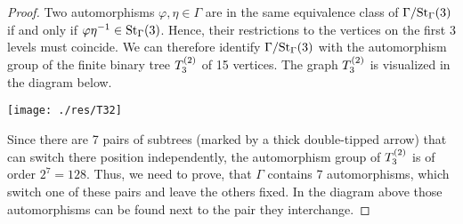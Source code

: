 \begin{proof}
Two automorphisms $\varphi,\eta\in\Gamma$ are in the same equivalence class of $\nicefrac{\Gamma}{\St[\Gamma]{3}}$ if and only if $\varphi\eta^{-1}\in\St[\Gamma]{3}$. Hence, their restrictions to the vertices on the first 3 levels must coincide. We can therefore identify $\nicefrac{\Gamma}{\St[\Gamma]{3}}$ with the automorphism group of the finite binary tree $\T_3$ of 15 vertices. The graph  $\T_3$ is visualized in the diagram below.

\begin{center}
\texttt{[image: ./res/T32]}
%
%
%
\end{center}

Since there are 7 pairs of subtrees (marked by a thick double-tipped arrow) that can switch there position independently, the automorphism group of $\T_3$ is of order $2^7=128$. Thus, we need to prove, that $\Gamma$ contains 7 automorphisms, which switch one of these pairs and leave the others fixed. In the diagram above those automorphisms can be found next to the pair they interchange.


\end{proof}
